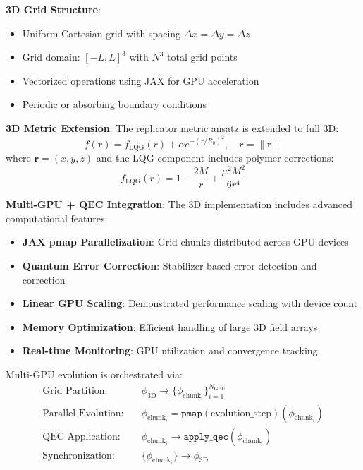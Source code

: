 \documentclass[11pt]{article}
\begin{document}
\textbf{3D Grid Structure}:
\begin{itemize}
\item Uniform Cartesian grid with spacing $\Delta x = \Delta y = \Delta z$
\item Grid domain: $[-L, L]^3$ with $N^3$ total grid points
\item Vectorized operations using JAX for GPU acceleration
\item Periodic or absorbing boundary conditions
\end{itemize}

\textbf{3D Metric Extension}:
The replicator metric ansatz is extended to full 3D:
\begin{equation}
f(\mathbf{r}) = f_{\text{LQG}}(r) + \alpha e^{-(r/R_0)^2}, \quad r = \|\mathbf{r}\|
\end{equation}
where $\mathbf{r} = (x,y,z)$ and the LQG component includes polymer corrections:
\begin{equation}
f_{\text{LQG}}(r) = 1 - \frac{2M}{r} + \frac{\mu^2 M^2}{6r^4}
\end{equation}

\textbf{Multi-GPU + QEC Integration}:
The 3D implementation includes advanced computational features:
\begin{itemize}
\item \textbf{JAX pmap Parallelization}: Grid chunks distributed across GPU devices
\item \textbf{Quantum Error Correction}: Stabilizer-based error detection and correction
\item \textbf{Linear GPU Scaling}: Demonstrated performance scaling with device count
\item \textbf{Memory Optimization}: Efficient handling of large 3D field arrays
\item \textbf{Real-time Monitoring}: GPU utilization and convergence tracking
\end{itemize}

Multi-GPU evolution is orchestrated via:
\begin{align}
\text{Grid Partition:} &\quad \phi_{\text{3D}} \to \{\phi_{\text{chunk}_i}\}_{i=1}^{N_{\text{GPU}}} \\
\text{Parallel Evolution:} &\quad \phi_{\text{chunk}_i} = \texttt{pmap}(\text{evolution\_step})(\phi_{\text{chunk}_i}) \\
\text{QEC Application:} &\quad \phi_{\text{chunk}_i} \to \texttt{apply\_qec}(\phi_{\text{chunk}_i}) \\
\text{Synchronization:} &\quad \{\phi_{\text{chunk}_i}\} \to \phi_{\text{3D}}
\end{align}
\end{document}
